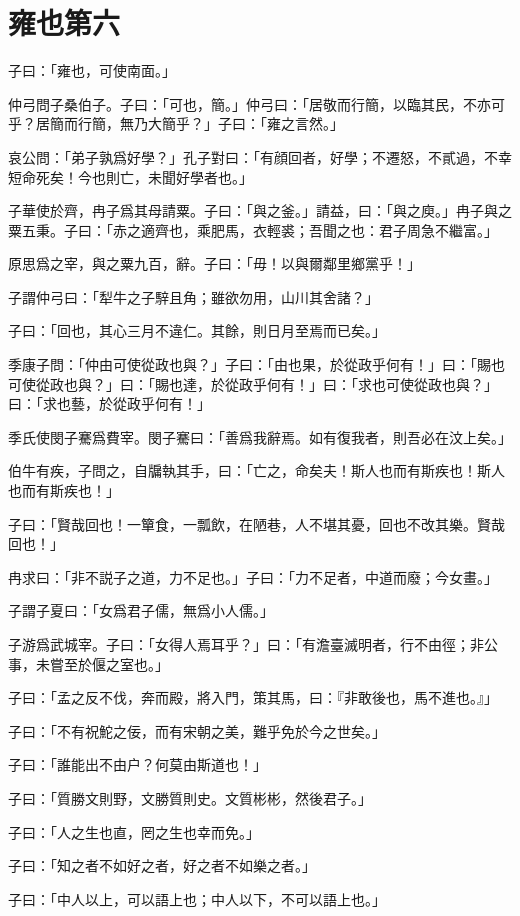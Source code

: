 \section[雍也第六]{雍也第六}

子曰：「雍也，可使南面。」

仲弓問子桑伯子。子曰：「可也，簡。」仲弓曰：「居敬而行簡，以臨其民，不亦可乎？居簡而行簡，無乃大簡乎？」子曰：「雍之言然。」

哀公問：「弟子孰爲好學？」孔子對曰：「有顔回者，好學；不遷怒，不貳過，不幸短命死矣！今也則亡，未聞好學者也。」

子華使於齊，冉子爲其母請粟。子曰：「與之釜。」請益，曰：「與之庾。」冉子與之粟五秉。子曰：「赤之適齊也，乘肥馬，衣輕裘；吾聞之也：君子周急不繼富。」

原思爲之宰，與之粟九百，辭。子曰：「毋！以與爾鄰里鄉黨乎！」

子謂仲弓曰：「犁牛之子騂且角；雖欲勿用，山川其舍諸？」

子曰：「回也，其心三月不違仁。其餘，則日月至焉而已矣。」

季康子問：「仲由可使從政也與？」子曰：「由也果，於從政乎何有！」曰：「賜也可使從政也與？」曰：「賜也達，於從政乎何有！」曰：「求也可使從政也與？」曰：「求也藝，於從政乎何有！」

季氏使閔子騫爲費宰。閔子騫曰：「善爲我辭焉。如有復我者，則吾必在汶上矣。」

伯牛有疾，子問之，自牖執其手，曰：「亡之，命矣夫！斯人也而有斯疾也！斯人也而有斯疾也！」

子曰：「賢哉回也！一簞食，一瓢飲，在陋巷，人不堪其憂，回也不改其樂。賢哉回也！」

冉求曰：「非不説子之道，力不足也。」子曰：「力不足者，中道而廢；今女畫。」

子謂子夏曰：「女爲君子儒，無爲小人儒。」

子游爲武城宰。子曰：「女得人焉耳乎？」曰：「有澹臺滅明者，行不由徑；非公事，未嘗至於偃之室也。」

子曰：「孟之反不伐，奔而殿，將入門，策其馬，曰：『非敢後也，馬不進也。』」

子曰：「不有祝鮀之佞，而有宋朝之美，難乎免於今之世矣。」

子曰：「誰能出不由户？何莫由斯道也！」

子曰：「質勝文則野，文勝質則史。文質彬彬，然後君子。」

子曰：「人之生也直，罔之生也幸而免。」

子曰：「知之者不如好之者，好之者不如樂之者。」

子曰：「中人以上，可以語上也；中人以下，不可以語上也。」

